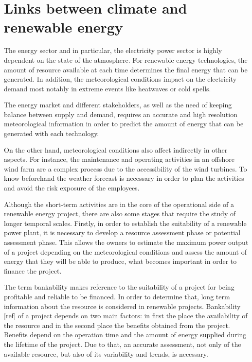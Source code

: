 

\section{Links between climate and renewable energy}

The energy sector and in particular, the electricity power sector is highly dependent on the state of the atmosphere. For renewable energy technologies, the amount of resource available at each time determines the final energy that can be generated. In addition, the meteorological conditions impact on the electricity demand most notably in extreme events like heatwaves or cold spells.

The energy market and different stakeholders, as well as the need of keeping balance between supply and demand, requires an accurate and high resolution meteorological information in order to predict the amount of energy that can be generated with each technology. 

On the other hand, meteorological conditions also affect indirectly in other aspects. For instance, the maintenance and operating activities in an offshore wind farm are a complex process due to the accessibility of the wind turbines. To know beforehand the weather forecast is necessary in order to plan the activities and avoid the risk exposure of the employees.

Although the short-term activities are in the core of the operational side of a renewable energy project, there are also some stages that require the study of longer temporal scales. Firstly, in order to establish the suitability of a renewable power plant, it is necessary to develop a resource assessment phase or potential assessment phase. This allows the owners to estimate the maximum power output of a project depending on the meteorological conditions and assess the amount of energy that they will be able to produce, what becomes important in order to finance the project.  

The term bankability makes reference to the suitability of a project for being profitable and reliable to be financed. In order to determine that, long term information about the resource is considered in renewable projects. Bankability [ref] of a project depends on two main factors: in first the place the availability of the resource and in the second place the benefits obtained from the project. Benefits depend on the operation time and the amount of energy supplied during the lifetime of the project. Due to that, an accurate assessment, not only of the available resource, but also of its variability and trends, is necessary. 

